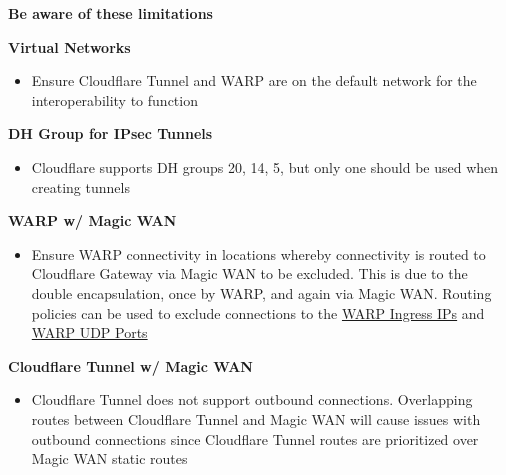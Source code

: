 \documentclass[
]{article}
\providecommand{\tightlist}{%
  \setlength{\itemsep}{0pt}\setlength{\parskip}{0pt}}\usepackage{longtable,booktabs,array}
\begin{document}
\begin{tcolorbox}[enhanced jigsaw, title=\textcolor{quarto-callout-warning-color}{\faExclamationTriangle}\hspace{0.5em}{Warning}, rightrule=.15mm, bottomtitle=1mm, opacitybacktitle=0.6, titlerule=0mm, colbacktitle=quarto-callout-warning-color!10!white, coltitle=black, opacityback=0, left=2mm, toprule=.15mm, breakable, toptitle=1mm, arc=.35mm, colback=white, bottomrule=.15mm, leftrule=.75mm, colframe=quarto-callout-warning-color-frame]

\textbf{Be aware of these limitations}

\textbf{Virtual Networks}

\begin{itemize}
\tightlist
\item
  Ensure Cloudflare Tunnel and WARP are on the default network for the
  interoperability to function
\end{itemize}

\textbf{DH Group for IPsec Tunnels}

\begin{itemize}
\tightlist
\item
  Cloudflare supports DH groups 20, 14, 5, but only one should be used
  when creating tunnels
\end{itemize}

\textbf{WARP w/ Magic WAN}

\begin{itemize}
\tightlist
\item
  Ensure WARP connectivity in locations whereby connectivity is routed
  to Cloudflare Gateway via Magic WAN to be excluded. This is due to the
  double encapsulation, once by WARP, and again via Magic WAN. Routing
  policies can be used to exclude connections to the
  \href{https://developers.cloudflare.com/cloudflare-one/connections/connect-devices/warp/deployment/firewall/\#warp-ingress-ip}{WARP
  Ingress IPs} and
  \href{https://developers.cloudflare.com/cloudflare-one/connections/connect-devices/warp/deployment/firewall/\#warp-udp-ports}{WARP
  UDP Ports}
\end{itemize}

\textbf{Cloudflare Tunnel w/ Magic WAN}

\begin{itemize}
\tightlist
\item
  Cloudflare Tunnel does not support outbound connections. Overlapping
  routes between Cloudflare Tunnel and Magic WAN will cause issues with
  outbound connections since Cloudflare Tunnel routes are prioritized
  over Magic WAN static routes
\end{itemize}


\end{tcolorbox}
\end{document}
